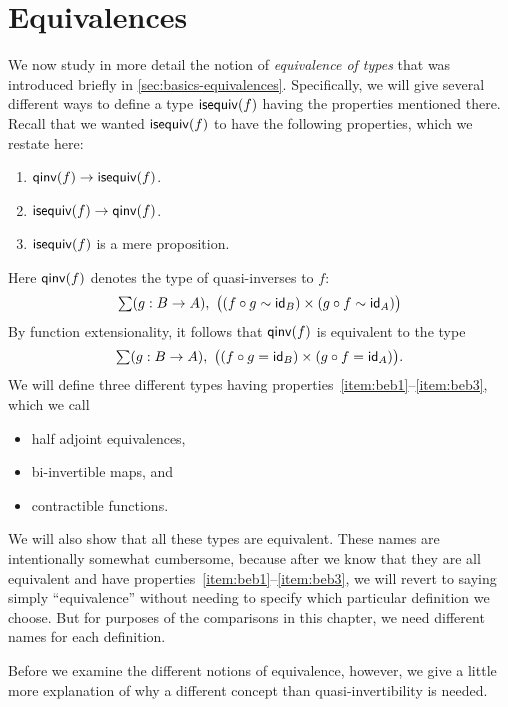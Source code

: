 \chapter{Equivalences}
\label{cha:equivalences}

We now study in more detail the notion of \emph{equivalence of types} that was introduced briefly in \autoref{sec:basics-equivalences}.
Specifically, we will give several different ways to define a type $\mathsf{isequiv}(f)$ having the properties mentioned there.
Recall that we wanted $\mathsf{isequiv}(f)$ to have the following properties, which we restate here:
\begin{enumerate}
\item $\mathsf{qinv}(f) \to \mathsf{isequiv} (f)$.\label{item:beb1}
\item $\mathsf{isequiv} (f) \to \mathsf{qinv}(f)$.\label{item:beb2}
\item $\mathsf{isequiv}(f)$ is a mere proposition.\label{item:beb3}
\end{enumerate}
Here $\mathsf{qinv}(f)$ denotes the type of quasi-inverses to $f$:
\begin{equation*}
  \sm{g:B\to A} \big((f \circ g \htpy \idfunc[B]) \times (g\circ f \htpy \idfunc[A])\big)
\end{equation*}
By function extensionality, it follows that $\mathsf{qinv}(f)$ is equivalent to the type
\begin{equation*}
  \sm{g:B\to A} \big((f \circ g = \idfunc[B]) \times (g\circ f = \idfunc[A])\big).
\end{equation*}
We will define three different types having properties~\ref{item:beb1}--\ref{item:beb3}, which we call
\begin{itemize}
\item half adjoint equivalences,
\item bi-invertible maps, and
\item contractible functions.
\end{itemize}
We will also show that all these types are equivalent.
These names are intentionally somewhat cumbersome, because after we know that they are all equivalent and have properties~\ref{item:beb1}--\ref{item:beb3}, we will revert to saying simply ``equivalence'' without needing to specify which particular definition we choose.
But for purposes of the comparisons in this chapter, we need different names for each definition.

Before we examine the different notions of equivalence, however, we give a little more explanation of why a different concept than quasi-invertibility is needed.

